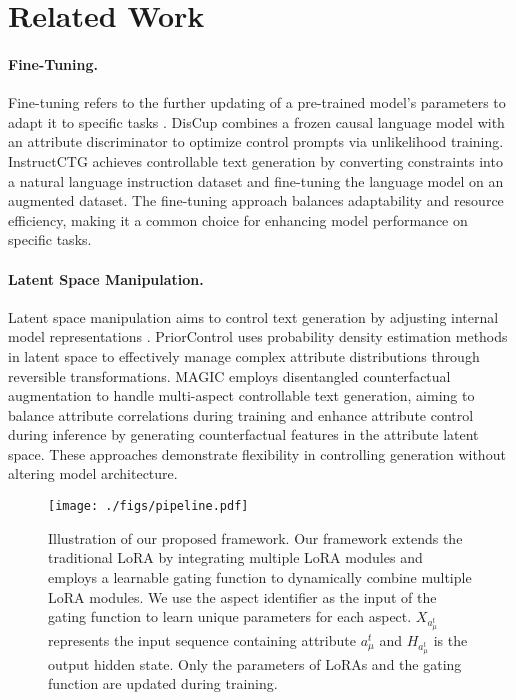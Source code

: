 \section{Related Work}
\paragraph{Fine-Tuning.} Fine-tuning refers to the further updating of a pre-trained model's parameters to adapt it to specific tasks \cite{feng-etal-2023-dunst,zheng-etal-2023-click,kumar-etal-2023-controlled}. DisCup \cite{zhang-song-2022-discup} combines a frozen causal language model with an attribute discriminator to optimize control prompts via unlikelihood training. InstructCTG \cite{pmlr-v202-zhou23g} achieves controllable text generation by converting constraints into a natural language instruction dataset and fine-tuning the language model on an augmented dataset. The fine-tuning approach balances adaptability and resource efficiency, making it a common choice for enhancing model performance on specific tasks.

\paragraph{Latent Space Manipulation.} Latent space manipulation aims to control text generation by adjusting internal model representations \cite{chan2021deep,lu-etal-2023-miracle}. PriorControl \cite{gu-etal-2023-controllable} uses probability density estimation methods in latent space to effectively manage complex attribute distributions through reversible transformations. MAGIC \cite{liu-etal-2024-multi} employs disentangled counterfactual augmentation to handle multi-aspect controllable text generation, aiming to balance attribute correlations during training and enhance attribute control during inference by generating counterfactual features in the attribute latent space. These approaches demonstrate flexibility in controlling generation without altering model architecture.


\begin{figure*}[h]
    \centering
    \texttt{[image: ./figs/pipeline.pdf]}
    \caption{Illustration of our proposed framework. Our framework extends the traditional LoRA by integrating multiple LoRA modules and employs a learnable gating function to dynamically combine multiple LoRA modules. We use the aspect identifier as the input of the gating function to learn unique parameters for each aspect. $X_{a^t_{\mu}}$ represents the input sequence containing attribute $a^t_{\mu}$ and $H_{a^t_{\mu}}$ is the output hidden state. Only the parameters of LoRAs and the gating function are updated during training.}
    \label{fig:1}
\end{figure*}


